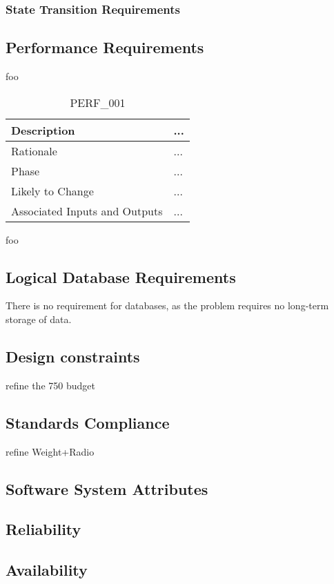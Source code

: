 \documentclass{article}
\begin{document}
\subsubsection{State Transition Requirements}

\subsection{Performance Requirements}
foo
\begin{table}[!h]
\begin{center}
\caption {PERF\_001} 
\label{PERF_001}
\begin{tabular}{ | m{3cm} | m{11cm} | }
\hline
Description & ... \\
\hline
Rationale & ... \\
\hline
Phase & ... \\
\hline
Likely to Change & ... \\
\hline
Associated Inputs and Outputs & ... \\
\hline
\end{tabular}
\end{center}
\end{table}

foo 

\subsection{Logical Database Requirements}
There is no requirement for databases, as the problem requires no long-term storage of data.
\subsection{Design constraints }
refine the 750 budget
\subsection{Standards Compliance }
refine Weight+Radio
\subsection{Software System Attributes}
\subsection{Reliability }
\subsection{Availability}
\end{document}
